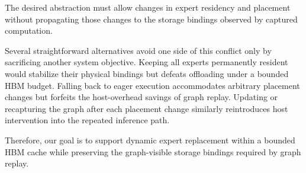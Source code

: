 The desired abstraction must allow changes in expert residency and placement without propagating those changes to the storage bindings observed by captured computation.

Several straightforward alternatives avoid one side of this conflict only by sacrificing another system objective. 
Keeping all experts permanently resident would stabilize their physical bindings but defeats offloading under a bounded HBM budget. 
Falling back to eager execution accommodates arbitrary placement changes but forfeits the host-overhead savings of graph replay. 
Updating or recapturing the graph after each placement change similarly reintroduces host intervention into the repeated inference path.

Therefore, our goal is to support dynamic expert replacement within a bounded HBM cache while preserving the graph-visible storage bindings required by graph replay. 

